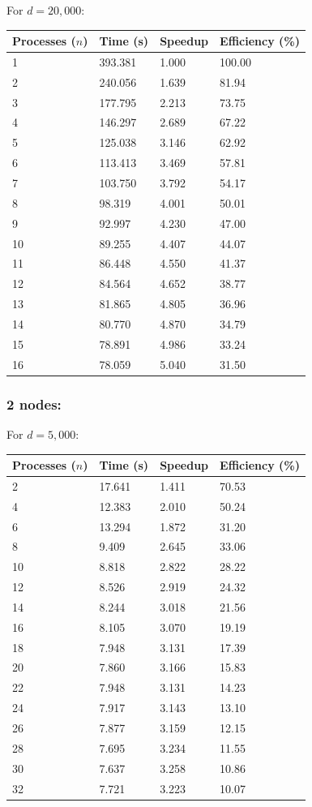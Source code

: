 \documentclass[11pt]{article}
\begin{document}
\begin{appendices}
\normalsize{
For $d=20,000$:}
\footnotesize{
\begin{center}
\begin{tabular}{|l|l|l|l|}
\hline
Processes ($n$) & Time (s) & Speedup & Efficiency (\%)\\
\hline
1 & 393.381 & 1.000 & 100.00\\
2 & 240.056 & 1.639 & 81.94\\
3 & 177.795 & 2.213 & 73.75\\
4 & 146.297 & 2.689 & 67.22\\
5 & 125.038 & 3.146 & 62.92\\
6 & 113.413 & 3.469 & 57.81\\
7 & 103.750 & 3.792 & 54.17\\
8 & 98.319 & 4.001 & 50.01\\
9 & 92.997 & 4.230 & 47.00\\
10 & 89.255 & 4.407 & 44.07\\
11 & 86.448 & 4.550 & 41.37\\
12 & 84.564 & 4.652 & 38.77\\
13 & 81.865 & 4.805 & 36.96\\
14 & 80.770 & 4.870 & 34.79\\
15 & 78.891 & 4.986 & 33.24\\
16 & 78.059 & 5.040 & 31.50\\
\hline
\end{tabular}
\end{center}}
\newpage

\subsubsection*{2 nodes:}
\normalsize{
For $d=5,000$:}
\footnotesize{
\begin{center}
\begin{tabular}{|l|l|l|l|}
\hline
Processes ($n$) & Time (s) & Speedup & Efficiency (\%)\\
\hline
2 & 17.641 & 1.411 & 70.53\\
4 & 12.383 & 2.010 & 50.24\\
6 & 13.294 & 1.872 & 31.20\\
8 & 9.409 & 2.645 & 33.06\\
10 & 8.818 & 2.822 & 28.22\\
12 & 8.526 & 2.919 & 24.32\\
14 & 8.244 & 3.018 & 21.56\\
16 & 8.105 & 3.070 & 19.19\\
18 & 7.948 & 3.131 & 17.39\\
20 & 7.860 & 3.166 & 15.83\\
22 & 7.948 & 3.131 & 14.23\\
24 & 7.917 & 3.143 & 13.10\\
26 & 7.877 & 3.159 & 12.15\\
28 & 7.695 & 3.234 & 11.55\\
30 & 7.637 & 3.258 & 10.86\\
32 & 7.721 & 3.223 & 10.07\\
\hline
\end{tabular}
\end{center}}


\end{appendices}
\end{document}

